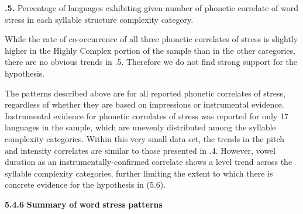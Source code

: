 \textbf{.5.} Percentage of languages exhibiting given number of phonetic correlate of word stress in each syllable structure complexity category.

  While the rate of co-occurrence of all three phonetic correlates of stress is slightly higher in the Highly Complex portion of the sample than in the other categories, there are no obvious trends in .5. Therefore we do not find strong support for the hypothesis.

  The patterns described above are for all reported phonetic correlates of stress, regardless of whether they are based on impressions or instrumental evidence. Instrumental evidence for phonetic correlates of stress was reported for only 17 languages in the sample, which are unevenly distributed among the syllable complexity categories. Within this very small data set, the trends in the pitch and intensity correlates are similar to those presented in .4. However, vowel duration as an instrumentally-confirmed correlate shows a level trend across the syllable complexity categories, further limiting the extent to which there is concrete evidence for the hypothesis in (5.6).

\textbf{5.4.6} \textbf{Summary} \textbf{of} \textbf{word} \textbf{stress} \textbf{patterns}

